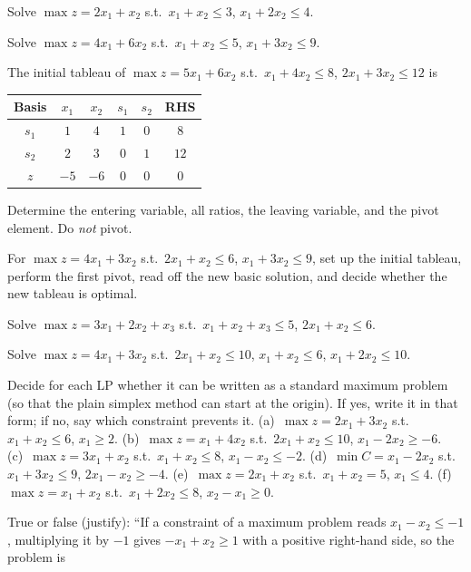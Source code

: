 \begin{problems}
  \item Solve $\max z=2x_1+x_2$ s.t.\ $x_1+x_2\le 3$, $x_1+2x_2\le 4$.
  \item Solve $\max z=4x_1+6x_2$ s.t.\ $x_1+x_2\le 5$, $x_1+3x_2\le 9$.
  \item The initial tableau of $\max z=5x_1+6x_2$ s.t.\ $x_1+4x_2\le 8$,
        $2x_1+3x_2\le 12$ is
        \begin{center}
        \begin{tabular}{c|cccc|c}
        Basis & $x_1$ & $x_2$ & $s_1$ & $s_2$ & RHS\\
        \hline
        $s_1$ & $1$ & $4$ & $1$ & $0$ & $8$\\
        $s_2$ & $2$ & $3$ & $0$ & $1$ & $12$\\
        \hline
        $z$ & $-5$ & $-6$ & $0$ & $0$ & $0$\\
        \end{tabular}
        \end{center}
        Determine the entering variable, all ratios, the leaving
        variable, and the pivot element. Do \emph{not} pivot.
  \item For $\max z=4x_1+3x_2$ s.t.\ $2x_1+x_2\le 6$, $x_1+3x_2\le 9$,
        set up the initial tableau, perform the first pivot, read off the
        new basic solution, and decide whether the new tableau is
        optimal.
  \item Solve $\max z=3x_1+2x_2+x_3$ s.t.\ $x_1+x_2+x_3\le 5$,
        $2x_1+x_2\le 6$.
  \item Solve $\max z=4x_1+3x_2$ s.t.\ $2x_1+x_2\le 10$, $x_1+x_2\le 6$,
        $x_1+2x_2\le 10$.
  \item Decide for each LP whether it can be written as a standard maximum
        problem (so that the plain simplex method can start at the
        origin). If yes, write it in that form; if no, say which
        constraint prevents it.
        (a)~$\max z=2x_1+3x_2$ s.t.\ $x_1+x_2\le 6$, $x_1\ge 2$.
        (b)~$\max z=x_1+4x_2$ s.t.\ $2x_1+x_2\le 10$, $x_1-2x_2\ge -6$.
        (c)~$\max z=3x_1+x_2$ s.t.\ $x_1+x_2\le 8$, $x_1-x_2\le -2$.
        (d)~$\min C=x_1-2x_2$ s.t.\ $x_1+3x_2\le 9$, $2x_1-x_2\ge -4$.
        (e)~$\max z=2x_1+x_2$ s.t.\ $x_1+x_2=5$, $x_1\le 4$.
        (f)~$\max z=x_1+x_2$ s.t.\ $x_1+2x_2\le 8$, $x_2-x_1\ge 0$.
  \item True or false (justify): ``If a constraint of a maximum problem
        reads $x_1-x_2\le -1$, multiplying it by $-1$ gives
        $-x_1+x_2\ge 1$ with a positive right-hand side, so the problem is

\end{problems}
